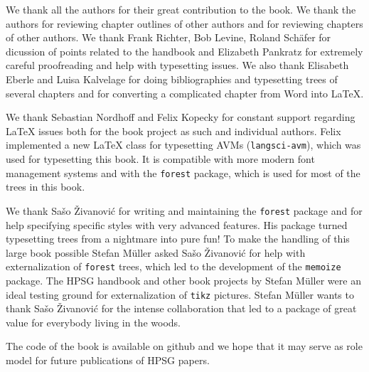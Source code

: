\begin{refsection}
We thank all the authors for their great contribution to the book. We thank the authors for
reviewing chapter outlines of other authors and for reviewing chapters of other authors. We thank
Frank Richter, Bob Levine, Roland Schäfer for dicussion of points related to the handbook and
Elizabeth Pankratz for extremely careful proofreading and help with typesetting issues. We also
thank Elisabeth Eberle and Luisa Kalvelage for doing bibliographies and typesetting trees of several
chapters and for converting a complicated chapter from Word into \LaTeX.

We thank Sebastian Nordhoff and Felix Kopecky for constant support regarding \LaTeX{} issues both for
the book project as such and individual authors. Felix implemented a new \LaTeX{} class for
typesetting AVMs (\texttt{langsci-avm}), which was used for typesetting this book. It is compatible with more
modern font management systems and with the \texttt{forest} package, which is used for most of the trees in this book.

We thank Sašo Živanović for writing and maintaining the \texttt{forest} package and for help
specifying specific styles with very advanced features. His package turned typesetting trees from a
nightmare into pure fun! To make the handling of this large book possible Stefan Müller asked Sašo
Živanović for help with externalization of \texttt{forest} trees, which led to the development of
the \texttt{memoize} package. The HPSG handbook and other book projects by Stefan Müller were an
ideal testing ground for externalization of \texttt{tikz} pictures. Stefan Müller wants to thank
Sašo Živanović for the intense collaboration that led to a package of great value for everybody
living in the woods.

The code of the book is available on github and we hope that it may serve as role model for future
publications of HPSG papers.


\printbibliography[heading=subbibliography]
\end{refsection}

